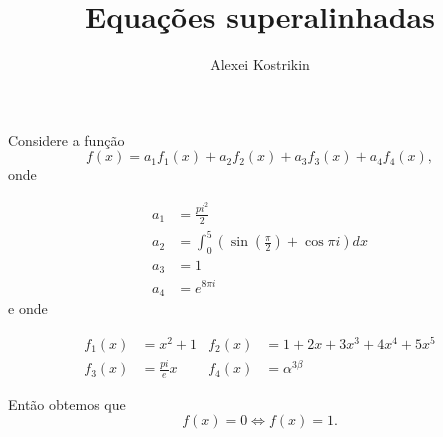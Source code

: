 \documentclass[12pt, a4paper]{article}
\title{Equações superalinhadas}
\author{Alexei Kostrikin}
\date{}
\begin{document}
  \maketitle

  Considere a função
  \[
    f(x) = a_1 f_1(x) + a_2 f_2(x) + a_3 f_3(x) + a_4 f_4(x),
  \]
  onde

  \begin{align}
    a_1 &= \frac{pi^2}{2}\\
    a_2 &= \int_0^5 \left( \sin\left(\frac{\pi}{2}\right) + \cos{\pi i} \right) dx\\
    a_3 &= 1\\
    a_4 &= e^{8\pi i}
  \end{align}
  e onde

  \begin{align*}
    f_1(x) &= x^2 + 1
    & f_2(x) &= 1+2x+3x^3+4x^4+5x^5\\
    f_3(x) &= \frac{pi}{e}x
    & f_4(x) &= \alpha^{3\beta}
  \end{align*}

  Então obtemos que
  \[
    f(x) = 0 \iff f(x) = 1.
  \]
\end{document}
